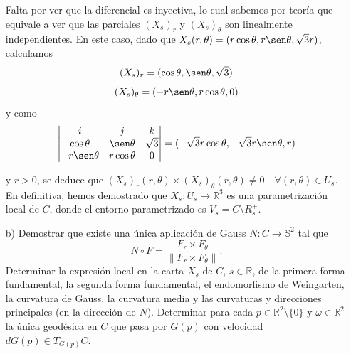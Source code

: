 \documentclass[12pt]{article}
\newcommand{\R}{\mathbb{R}}
\begin{document}
\begin{ejercicio}
\begin{enumerate}
            \newpage

            Falta por ver que la diferencial es inyectiva, lo cual sabemos por teoría que equivale a ver que las parciales $(X_s)_r$ y $(X_s)_\theta$
            son linealmente independientes. En este caso, dado que $X_s(r, \theta) = (r \cos \theta, r \sen \theta, \sqrt{3}r)$, calculamos
            $$(X_s)_r = (\cos \theta, \sen \theta, \sqrt{3})$$
            $$(X_s)_\theta = (-r \sen \theta, r \cos \theta, 0)$$
            y como 
            $$\begin{vmatrix}
                i & j & k \\
                \cos \theta & \sen \theta & \sqrt{3} \\
                - r \sen \theta & r \cos \theta & 0
            \end{vmatrix} = (-\sqrt{3}r \cos \theta, -\sqrt{3} r \sen \theta, r)$$

            y $r > 0$, se deduce que $(X_s)_r(r, \theta) \times (X_s)_\theta(r, \theta) \neq 0 \quad \forall (r, \theta) \in U_s$. \\
            
            En definitiva, hemos demostrado que $X_s : U_s \to \R^3$ es una parametrización local de $C$, donde el entorno parametrizado es 
            $V_s = C \setminus R_s^{+}$.  

            \item[b)] Demostrar que existe una única aplicación de Gauss $N:C\to \mathbb{S}^2$ tal que
            \begin{equation}\label{equation:ec3}
                N\circ F=\frac{F_r\times F_\theta}{\|F_r\times F_\theta\|}.
            \end{equation}
            Determinar la expresión local en la carta $X_s$ de $C$, $s\in\mathbb{R}$, de la primera forma fundamental, 
            la segunda forma fundamental, el endomorfismo de Weingarten, la curvatura de Gauss, la curvatura media y las 
            curvaturas y direcciones principales (en la dirección de $N$). Determinar para cada $p \in \R^2 \setminus \{0\}$
            y $\omega \in \R^2$ la única geodésica en $C$ que pasa por $G(p)$ con velocidad $dG(p) \in T_{G(p)} C$. \\


\end{enumerate}
\end{ejercicio}
\end{document}
